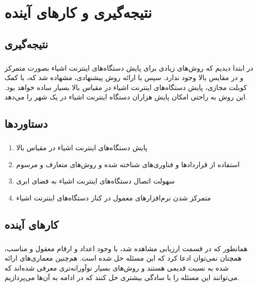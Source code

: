 
\chapter{نتیجه‌گیری و کارهای آینده} \label{ch:concl}
\thispagestyle{empty}


\section{نتیجه‌گیری}
\paragraph{}
{
      در ابتدا دیدیم که روش‌های زیادی برای پایش دستگاه‌های اینترنت اشیاء بصورت متمرکز و در مقایس بالا
      وجود ندارد. سپس با ارائه روش پیشنهادی، مشهاده شد که، با کمک کوبلت مجازی، پایش‌ دستگاه‌های اینترنت اشیاء
      در مقیاس بالا بسیار ساده خواهد بود. این روش به راحتی امکان پایش هزاران دستگاه اینترنت اشیاء در یک شهر را می‌دهد.
}

\section{دستاوردها}
\paragraph{}
{
      \begin{enumerate}
            \item پایش دستگاه‌های اینترنت اشیاء در مقیاس بالا
            \item استفاده از قراردادها و فناوری‌های شناخته شده و روش‌های متعارف و مرسوم
            \item سهولت اتصال دستگاه‌های اینترنت اشیاء به فضای ابری
            \item متمرکز شدن نرم‌افزار‌های معمول در کنار دستگاه‌های اینترنت اشیاء
      \end{enumerate}
}

\section{کارهای آینده}
\paragraph{}
{
      همانطور که در قسمت ارزیابی مشاهده شد، با وجود اعداد و ارقام معقول و مناسب، همچنان نمی‌توان ادعا کرد که 
      این مسئله حل شده است. هم‌چنین معماری‌های ارائه شده به نسبت قدیمی هستند و روش‌های بسیار نوآورانه‌تری معرفی 
      شده‌اند که می‌توانند این مسئله را با سادگی بیشتری حل کنند که در ادامه به آن‌ها می‌پردازیم.
}

